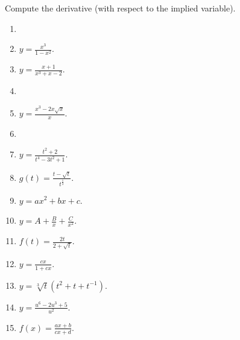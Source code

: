 Compute the derivative (with respect to the implied variable).
\begin{multicols}{2}
\begin{enumerate}[ref={\fcProblemRef}]
\item 
\item $\displaystyle y=\frac{x^3}{1-x^2}$.

\item $\displaystyle y=\frac{x+1}{x^3+x-2}$.

\item 
\item $\displaystyle y=\frac{x^3-2x\sqrt{x}}{x}$.

\item 
\item $\displaystyle y=\frac{t^2+2}{t^4-3t^2+1}$.

\item $\displaystyle g(t)=\frac{t-\sqrt{t}}{t^{\frac{1}{3}}}$.

\item $\displaystyle y=a x^2+b x + c$.

\item $\displaystyle y=A+\frac{B}x +\frac{C}{x^2}$.

\item $\displaystyle f(t)=\frac{2t}{2+\sqrt{t}}$.

\item $\displaystyle y=\frac{c x}{1+c x}$.

\item $\displaystyle y=\sqrt[3]{t}(t^2+t+t^{-1}) $.

\item $\displaystyle y=\frac{u^6-2u^3+5}{u^2}$.

\item $\displaystyle f(x)=\frac{a x+b}{c x+ d}$.


\end{enumerate}
\end{multicols}
